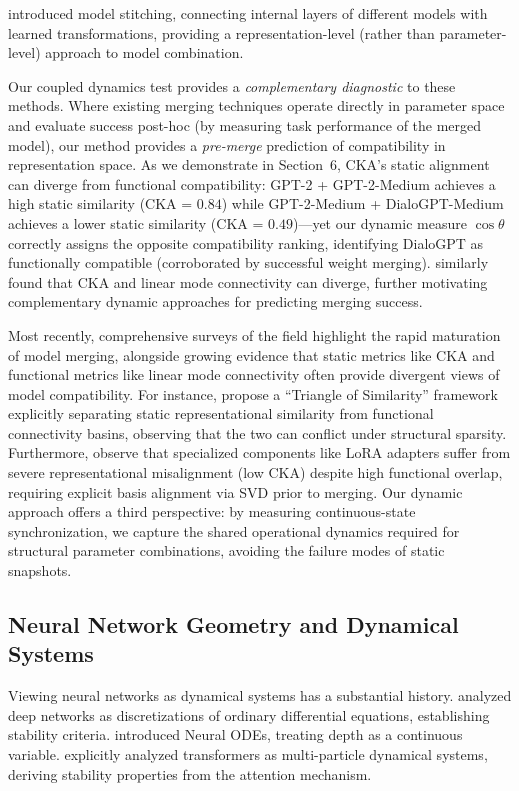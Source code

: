 \documentclass[10pt]{article} %
\theoremstyle{plain}
\theoremstyle{definition}
\theoremstyle{remark}
\begin{document}
\citet{bansal2021stitching} introduced model stitching, connecting internal layers of different models with learned transformations, providing a representation-level (rather than parameter-level) approach to model combination.

Our coupled dynamics test provides a \textit{complementary diagnostic} to these methods. Where existing merging techniques operate directly in parameter space and evaluate success post-hoc (by measuring task performance of the merged model), our method provides a \textit{pre-merge} prediction of compatibility in representation space. As we demonstrate in Section~6, CKA's static alignment can diverge from functional compatibility: GPT-2 + GPT-2-Medium achieves a high static similarity (CKA = $0.84$) while GPT-2-Medium + DialoGPT-Medium achieves a lower static similarity (CKA = $0.49$)---yet our dynamic measure $\cos \theta$ correctly assigns the opposite compatibility ranking, identifying DialoGPT as functionally compatible (corroborated by successful weight merging). \citet{zhou2024crosslmc} similarly found that CKA and linear mode connectivity can diverge, further motivating complementary dynamic approaches for predicting merging success.

Most recently, comprehensive surveys of the field \citep{yang2024model,song2026model} highlight the rapid maturation of model merging, alongside growing evidence that static metrics like CKA and functional metrics like linear mode connectivity often provide divergent views of model compatibility. For instance, \citet{sirikova2026triangle} propose a ``Triangle of Similarity'' framework explicitly separating static representational similarity from functional connectivity basins, observing that the two can conflict under structural sparsity. Furthermore, \citet{stoica2025knots} observe that specialized components like LoRA adapters suffer from severe representational misalignment (low CKA) despite high functional overlap, requiring explicit basis alignment via SVD prior to merging. Our dynamic approach offers a third perspective: by measuring continuous-state synchronization, we capture the shared operational dynamics required for structural parameter combinations, avoiding the failure modes of static snapshots.

\subsection{Neural Network Geometry and Dynamical Systems}

Viewing neural networks as dynamical systems has a substantial history. \citet{haber2017stable} analyzed deep networks as discretizations of ordinary differential equations, establishing stability criteria. \citet{chen2018neuralode} introduced Neural ODEs, treating depth as a continuous variable. \citet{lu2020understanding} explicitly analyzed transformers as multi-particle dynamical systems, deriving stability properties from the attention mechanism.
\end{document}
